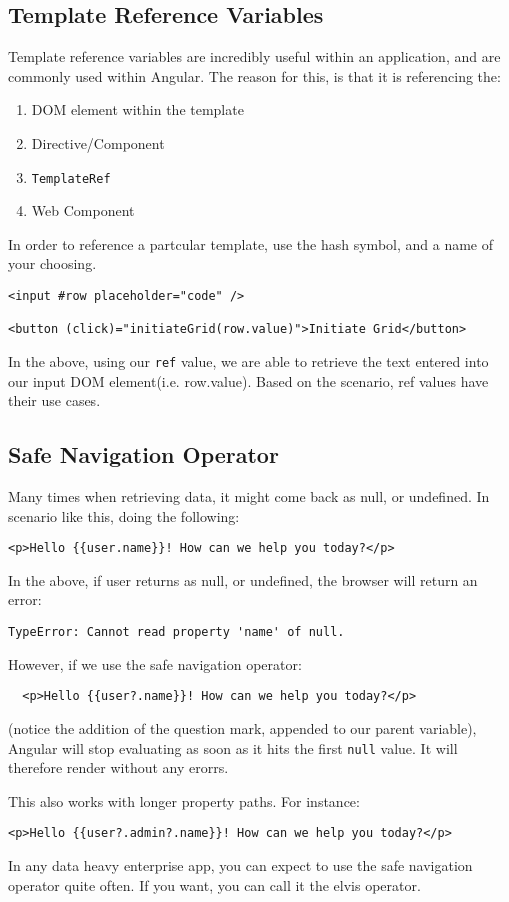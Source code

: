 \subsection{ Template Reference Variables }
Template reference variables are incredibly useful within an application, and 
are commonly used within Angular. The reason for this, is that it is 
referencing the:
\begin{enumerate}
  \item DOM element within the template
  \item Directive/Component
  \item \lstinline{TemplateRef}
  \item Web Component
\end{enumerate}

In order to reference a partcular template, use the hash symbol, and a name of 
your choosing. 

\begin{lstlisting}
<input #row placeholder="code" />  

<button (click)="initiateGrid(row.value)">Initiate Grid</button>
\end{lstlisting}

In the above, using our \lstinline{ref} value, we are able to retrieve the 
text entered into our input DOM element(i.e. row.value). Based on the scenario, 
ref values have their use cases. 

\subsection{ Safe Navigation Operator }
Many times when retrieving data, it might come back as null, or undefined. In
scenario like this, doing the following: 
\begin{lstlisting}
<p>Hello {{user.name}}! How can we help you today?</p>  
\end{lstlisting}

In the above, if user returns as null, or undefined, the browser will return 
an error: 
\begin{lstlisting}
TypeError: Cannot read property 'name' of null.  
\end{lstlisting}

However, if we use the safe navigation operator: 
\begin{lstlisting}
  <p>Hello {{user?.name}}! How can we help you today?</p>  
\end{lstlisting}

(notice the addition of the question mark, appended to our parent variable), 
Angular will stop evaluating as soon as it hits the first \lstinline{null}
value. It will therefore render without any erorrs.

This also works with longer property paths. For instance: 
\begin{lstlisting}
<p>Hello {{user?.admin?.name}}! How can we help you today?</p>    
\end{lstlisting}

In any data heavy enterprise app, you can expect to use the safe navigation
operator quite often. If you want, you can call it the elvis operator. 
